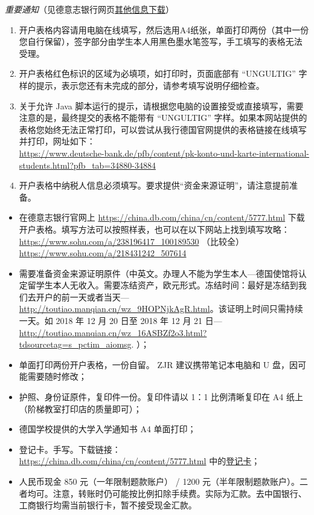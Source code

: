 \documentclass[final]{book}
\begin{document}
\emph{重要通知}（见德意志银行网页\href{https://china.db.com/china/cn/content/5777.html}{其他信息下载}）
\begin{enumerate}
\item 开户表格内容请用电脑在线填写，然后选用A4纸张，单面打印两份（其中一份您自行保留），签字部分由学生本人用黑色墨水笔签写，手工填写的表格无法受理。
\item 开户表格红色标识的区域为必填项，如打印时，页面底部有 ``UNGULTIG'' 字样的提示，表示您还有未完成的部分，请参考填写说明仔细检查。
\item \sloppy 关于允许 Java 脚本运行的提示，请根据您电脑的设置接受或直接填写，需要注意的是，最终提交的表格不能带有 ``UNGULTIG'' 字样。如果本网站提供的表格您始终无法正常打印，可以尝试从我行德国官网提供的表格链接在线填写并打印，网址如下：\\
\url{https://www.deutsche-bank.de/pfb/content/pk-konto-und-karte-international-students.html?pfb_tab=34880-34884}
\item 开户表格中纳税人信息必须填写。要求提供“资金来源证明”，请注意提前准备。
\end{enumerate}
\begin{itemize}
\item 在德意志银行官网上 \url{https://china.db.com/china/cn/content/5777.html} 下载开户表格。填写方法可以按照样表，也可以在以下网站上找到填写攻略：\\
\url{https://www.sohu.com/a/238196417_100189530} （比较全）\\
\url{https://www.sohu.com/a/218431242_507614}
\item\label{de-bank-ZJR-laptop-USB} 需要准备资金来源证明原件（中英文。办理人不能为学生本人---德国使馆将认定留学生本人无收入。需要冻结资产，欧元形式。冻结时间：最好是冻结到我们去开户的前一天或者当天---\url{http://toutiao.manqian.cn/wz_9HOPNjkAgR.html}。该证明上时间只需持续一天。如 2018 年 12 月 20 日至 2018 年 12 月 21 日---\url{http://toutiao.manqian.cn/wz_16ASBZf2o3.html?tdsourcetag=s_pctim_aiomsg}. ）；
\item 单面打印两份开户表格，一份自留。 ZJR 建议携带笔记本电脑和 U 盘，因可能需要随时修改；
\item 护照、身份证原件，复印件一份。复印件请以 1：1 比例清晰复印在 A4 纸上（阶梯教室打印店的质量即可）；
\item 德国学校提供的大学入学通知书 A4 单面打印；
\item 登记卡。手写。下载链接： \url{https://china.db.com/china/cn/content/5777.html} 中的\href{https://china.db.com/china/docs/Deutsche_Bank-China-Account-Opening-Process-And-Introduction.pdf}{登记卡}；
\item 人民币现金 850 元（一年限制题款账户） / 1200 元（半年限制题款账户）。二者均可。注意，转账时仍可能按比例扣除手续费。实际为汇款。去中国银行、工商银行均需当前银行卡，暂不接受现金汇款。
\end{itemize}
\end{document}
